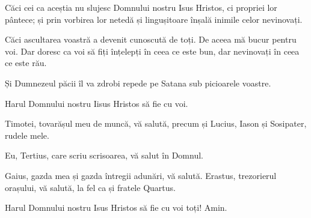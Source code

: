 {Căci cei ca aceștia nu slujesc Domnului nostru Isus Hristos, ci propriei lor pântece; și prin vorbirea lor netedă și lingușitoare înșală inimile celor nevinovați.

Căci ascultarea voastră a devenit cunoscută de toți. De aceea mă bucur pentru voi. Dar doresc ca voi să fiți înțelepți în ceea ce este bun, dar nevinovați în ceea ce este rău.

Și Dumnezeul păcii îl va zdrobi repede pe Satana sub picioarele voastre.

\par }{\PP Harul Domnului nostru Iisus Hristos să fie cu voi.


\par }{\PP {}Timotei, tovarășul meu de muncă, vă salută, precum și Lucius, Iason și Sosipater, rudele mele.

Eu, Tertius, care scriu scrisoarea, vă salut în Domnul.

Gaius, gazda mea și gazda întregii adunări, vă salută. Erastus, trezorierul orașului, vă salută, la fel ca și fratele Quartus.

Harul Domnului nostru Isus Hristos să fie cu voi toți! Amin.



\par }